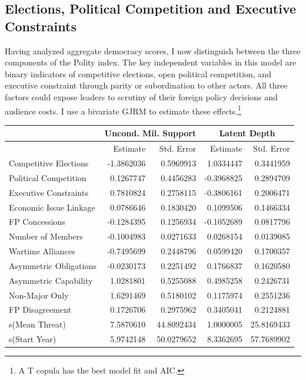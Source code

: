 \documentclass[12pt]{article}
\begin{document}
\subsection{Elections, Political Competition and Executive Constraints} 


Having analyzed aggregate democracy scores, I now distinguish between the three components of the Polity index. 
The key independent variables in this model are binary indicators of competitive elections, open political competition, and executive constraint through parity or subordination to other actors. 
All three factors could expose leaders to scrutiny of their foreign policy decisions and audience costs. 
I use a bivariate GJRM to estimate these effects.\footnote{A T copula has the best model fit and AIC.} 


\begin{table}[ht]
\centering
\begin{tabular}{lrrrr}
 & \multicolumn{2}{c}{Uncond. Mil. Support} & \multicolumn{2}{c}{Latent Depth}\\ \hline
   & Estimate & Std. Error & Estimate & Std. Error \\ 
  \hline 
  Competitive Elections & -1.3862036 & 0.5969913 & 1.0334447 & 0.3441959 \\ 
  Political Competition & 0.1267747 & 0.4456283 & -0.3968825 & 0.2894709 \\ 
  Executive Constraints & 0.7810824 & 0.2758115 & -0.3806161 & 0.2006471 \\ 
  Economic Issue Linkage & 0.0786646 & 0.1830420 & 0.1099506 & 0.1466334 \\ 
  FP Concessions & -0.1284395 & 0.1256934 & -0.1052689 & 0.0817796 \\ 
  Number of Members & -0.1004983 & 0.0271633 & 0.0268154 & 0.0139085 \\ 
  Wartime Alliances & -0.7495699 & 0.2448796 & 0.0599420 & 0.1700357 \\ 
  Asymmetric Obligations & -0.0230173 & 0.2251492 & 0.1766837 & 0.1620580 \\ 
  Asymmetric Capability & 1.0281801 & 0.5255088 & 0.4985258 & 0.2426731 \\ 
  Non-Major Only & 1.6291469 & 0.5180102 & 0.1175974 & 0.2551236 \\ 
  FP Disagreement & 0.1726706 & 0.2975962 & 0.3405041 & 0.2124881 \\ 
  s(Mean Threat) & 7.5870610 & 44.8092434 & 1.0000005 & 25.8169433 \\ 
  s(Start Year) & 5.9742148 & 50.0279652 & 8.3362695 & 57.7689902 \\ 

\end{tabular}
\end{table}
\end{document}
